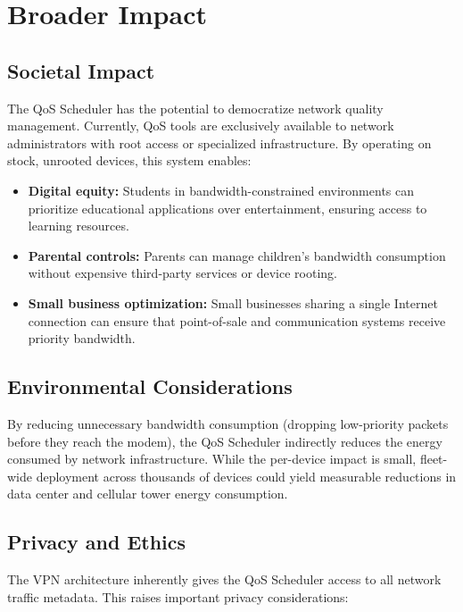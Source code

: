 \section{Broader Impact}
\label{sec:impact}

\subsection{Societal Impact}

The QoS Scheduler has the potential to democratize network quality management. Currently, QoS tools are exclusively available to network administrators with root access or specialized infrastructure. By operating on stock, unrooted devices, this system enables:

\begin{itemize}[noitemsep]
    \item \textbf{Digital equity:} Students in bandwidth-constrained environments can prioritize educational applications over entertainment, ensuring access to learning resources.
    \item \textbf{Parental controls:} Parents can manage children's bandwidth consumption without expensive third-party services or device rooting.
    \item \textbf{Small business optimization:} Small businesses sharing a single Internet connection can ensure that point-of-sale and communication systems receive priority bandwidth.
\end{itemize}

\subsection{Environmental Considerations}

By reducing unnecessary bandwidth consumption (dropping low-priority packets before they reach the modem), the QoS Scheduler indirectly reduces the energy consumed by network infrastructure. While the per-device impact is small, fleet-wide deployment across thousands of devices could yield measurable reductions in data center and cellular tower energy consumption.

\subsection{Privacy and Ethics}

The VPN architecture inherently gives the QoS Scheduler access to all network traffic metadata. This raises important privacy considerations:

